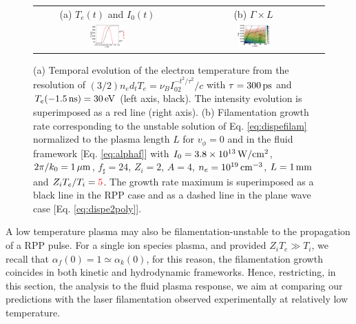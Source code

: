 \documentclass[
 reprint,
 superscriptaddress,
 amsmath,amssymb,
 aps,
]{revtex4-1}
\def\tc{\textcolor{red}}
\begin{document}
\begin{figure}
\begin{tabular}{cc}
(a) $T_e(t)$ and $I_0(t)$&
(b) $\Gamma \times L$  \\
\includegraphics[width=0.245\textwidth]{xp_fuchs_te_new.eps}& 
\includegraphics[width=0.24\textwidth]{xp_fuchs_new.eps}
\end{tabular}
\caption{ \label{fig:xpfuchs_th}  
(a) Temporal evolution of the electron temperature 
from the resolution of $(3/2)n_e d_tT_e=\nu_BI_02^{-t^2/\tau^2}/c$ with $\tau = 300\,\rm ps$  and $T_e(-1.5 \, \rm{ns})=30\,\rm eV$ (left axis, black).
The intensity evolution is superimposed as a red line (right axis).
(b) Filamentation growth rate corresponding to the unstable solution  of Eq. \eqref{eq:dispefilam} normalized to the plasma length  $L$  for $v_\phi=0$ and in the fluid framework [Eq. \eqref{eq:alphaf}] with $I_0=3.8\times 10^{13}\, \rm W/cm^2$, $2\pi/k_0=1\,\rm\mu m$, $f_\sharp=24$, $Z_i=2$, $A=4$, $n_e=10^{19} \,\rm cm^{-3}$,  $L=1\,\rm mm$ and  $Z_iT_e/T_i=\tc{5}$. 
The growth rate maximum is superimposed as a  black line in the RPP case and as a dashed line in the plane wave case [Eq. \eqref{eq:dispe2poly}].
 }
\end{figure}

A low temperature plasma may also be filamentation-unstable to the  propagation of a RPP pulse.
For a single ion species plasma, and provided $Z_iT_e\gg T_i$,   we recall that $\alpha_f(0)=1\simeq \alpha_k(0)$, for this reason, the filamentation growth coincides in both  kinetic and hydrodynamic frameworks. 
Hence, restricting, in this section, the analysis to the fluid plasma response, we aim at comparing our predictions with the laser filamentation observed experimentally at relatively low temperature.
\end{document}
